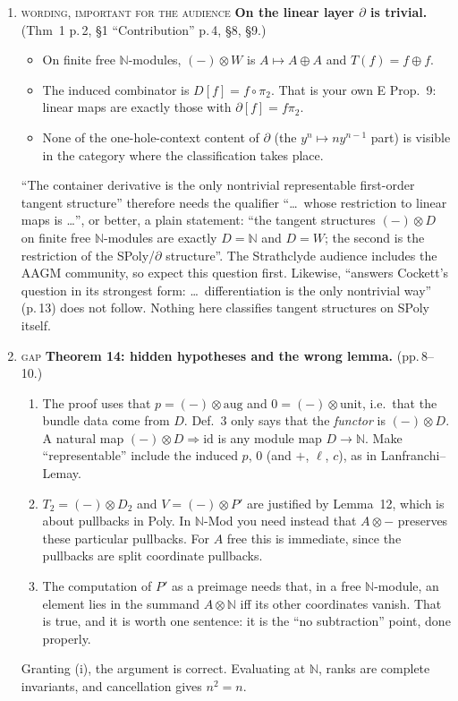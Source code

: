 \documentclass[11pt]{article}
\newcommand{\N}{\mathbb{N}}
\newcommand{\iss}[1]{\textsc{#1}}
\begin{document}
\begin{enumerate}[label=\textbf{U\arabic*.},leftmargin=*]
\item \iss{wording, important for the audience} \textbf{On the linear layer $\partial$ is trivial.}
(Thm~1 p.\,2, \S1 ``Contribution'' p.\,4, \S8, \S9.)
\begin{itemize}[leftmargin=1.2em]
\item On finite free $\N$-modules, $(-)\otimes W$ is $A\mapsto A\oplus A$ and $T(f)=f\oplus f$.
\item The induced combinator is $D[f]=f\circ\pi_2$. That is your own E Prop.~9: linear maps are
exactly those with $\partial[f]=f\pi_2$.
\item None of the one-hole-context content of $\partial$ (the $y^n\mapsto ny^{n-1}$ part) is visible
in the category where the classification takes place.
\end{itemize}
``The container derivative is the only nontrivial representable first-order tangent structure''
therefore needs the qualifier ``\dots\ whose restriction to linear maps is \dots'', or better, a
plain statement: ``the tangent structures $(-)\otimes D$ on finite free $\N$-modules are exactly
$D=\N$ and $D=W$; the second is the restriction of the SPoly/$\partial$ structure''. The Strathclyde
audience includes the AAGM community, so expect this question first.
Likewise, ``answers Cockett's question in its strongest form: \dots\ differentiation is the only
nontrivial way'' (p.\,13) does not follow. Nothing here classifies tangent structures on SPoly
itself.

\item \iss{gap} \textbf{Theorem 14: hidden hypotheses and the wrong lemma.} (pp.\,8--10.)
\begin{enumerate}[label=(\roman*),leftmargin=1.5em]
\item The proof uses that $p=(-)\otimes\mathrm{aug}$ and $0=(-)\otimes\mathrm{unit}$, i.e.\ that
the bundle data come from $D$. Def.~3 only says that the \emph{functor} is $(-)\otimes D$. A natural
map $(-)\otimes D\Rightarrow\mathrm{id}$ is any module map $D\to\N$. Make ``representable'' include
the induced $p$, $0$ (and $+$, $\ell$, $c$), as in Lanfranchi--Lemay.
\item $T_2=(-)\otimes D_2$ and $V=(-)\otimes P'$ are justified by Lemma~12, which is about pullbacks
in Poly. In $\N$-Mod you need instead that $A\otimes-$ preserves these particular pullbacks. For $A$
free this is immediate, since the pullbacks are split coordinate pullbacks.
\item The computation of $P'$ as a preimage needs that, in a free $\N$-module, an element lies in the
summand $A\otimes\N$ iff its other coordinates vanish. That is true, and it is worth one sentence:
it is the ``no subtraction'' point, done properly.
\end{enumerate}
Granting (i), the argument is correct. Evaluating at $\N$, ranks are complete invariants, and
cancellation gives $n^2=n$.


\end{enumerate}
\end{document}
